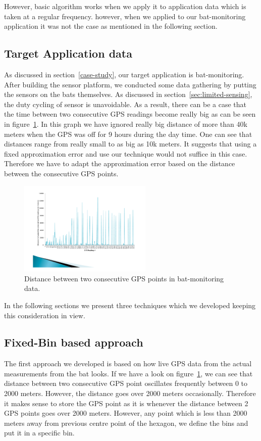 \documentclass[conference]{IEEEtran}
\begin{document}
However, basic algorithm works when we apply it to application data which is taken at a regular frequency. however, 
when we applied to our bat-monitoring application it was not the case as mentioned in the following section.

\subsection{Target Application data}
As discussed in section~\ref{case-study}, our target application is bat-monitoring. After building the sensor platform, 
we conducted some data gathering by putting the sensors on the bats themselves. As discussed in 
section~\ref{sec:limited-sensing}, the duty cycling of sensor is unavoidable. As a result, there can be a case that the 
time between two consecutive GPS readings become really big as can be seen in figure~\ref{fig:distance-bat-monitoring}. 
In this graph we have ignored really big distance of more than 40k meters when the GPS was off for 9 hours during the day 
time. One can see that distances range from really small to as big as 10k meters. It suggests that using a fixed approximation 
error and use our technique would not suffice in this case. Therefore we have to adapt the approximation error based on the 
distance between the consecutive GPS points.

\begin{figure}[ht]
  \centering
  \includegraphics[width=2.5in]{images/distance-based.pdf}
  \caption {Distance between two consecutive GPS points in bat-monitoring data.}
  \label{fig:distance-bat-monitoring}
\end{figure}
In the following sections we present three techniques which we developed keeping this consideration in view.

\subsection{Fixed-Bin based approach}\label{sec:fixed-bin}
The first approach we developed is based on how live GPS data from the actual measurements from the bat looks. If we 
have a look on figure~\ref{fig:distance-bat-monitoring}, we can see that distance between two consecutive GPS point 
oscillates frequently between 0 to 2000 meters. However, the distance goes over 2000 meters occasionally. Therefore it 
makes sense to store the GPS point as it is whenever the distance between 2 GPS points goes over 2000 meters. However, 
any point which is less than 2000 meters away from previous centre point of the hexagon, we define the bins and put it in a 
specific bin.
\end{document}
